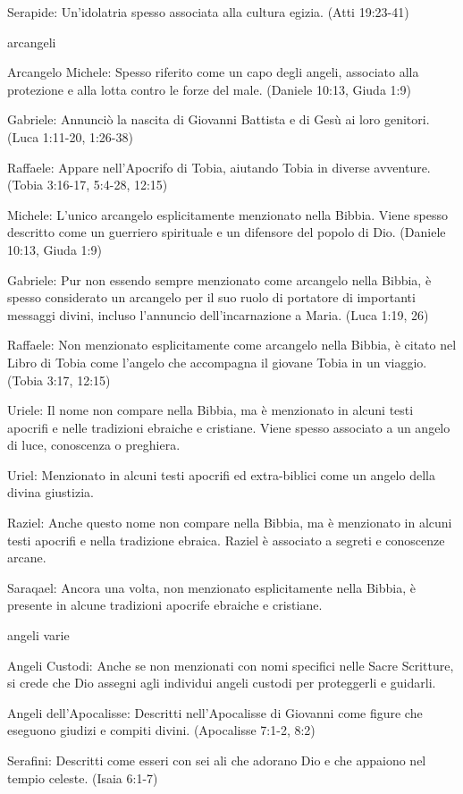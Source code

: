 \documentclass[12pt,a4paper,twoside,openany]{book}
\begin{document}
Serapide: Un'idolatria spesso associata alla cultura egizia. (Atti 19:23-41)


arcangeli


Arcangelo Michele: Spesso riferito come un capo degli angeli, associato alla protezione e alla lotta contro le forze del male. (Daniele 10:13, Giuda 1:9)

Gabriele: Annunciò la nascita di Giovanni Battista e di Gesù ai loro genitori. (Luca 1:11-20, 1:26-38)

Raffaele: Appare nell'Apocrifo di Tobia, aiutando Tobia in diverse avventure. (Tobia 3:16-17, 5:4-28, 12:15)


Michele: L'unico arcangelo esplicitamente menzionato nella Bibbia. Viene spesso descritto come un guerriero spirituale e un difensore del popolo di Dio. (Daniele 10:13, Giuda 1:9)

Gabriele: Pur non essendo sempre menzionato come arcangelo nella Bibbia, è spesso considerato un arcangelo per il suo ruolo di portatore di importanti messaggi divini, incluso l'annuncio dell'incarnazione a Maria. (Luca 1:19, 26)

Raffaele: Non menzionato esplicitamente come arcangelo nella Bibbia, è citato nel Libro di Tobia come l'angelo che accompagna il giovane Tobia in un viaggio. (Tobia 3:17, 12:15)

Uriele: Il nome non compare nella Bibbia, ma è menzionato in alcuni testi apocrifi e nelle tradizioni ebraiche e cristiane. Viene spesso associato a un angelo di luce, conoscenza o preghiera.

Uriel: Menzionato in alcuni testi apocrifi ed extra-biblici come un angelo della divina giustizia.

Raziel: Anche questo nome non compare nella Bibbia, ma è menzionato in alcuni testi apocrifi e nella tradizione ebraica. Raziel è associato a segreti e conoscenze arcane.


Saraqael: Ancora una volta, non menzionato esplicitamente nella Bibbia, è presente in alcune tradizioni apocrife ebraiche e cristiane.

angeli varie

Angeli Custodi: Anche se non menzionati con nomi specifici nelle Sacre Scritture, si crede che Dio assegni agli individui angeli custodi per proteggerli e guidarli.

Angeli dell'Apocalisse: Descritti nell'Apocalisse di Giovanni come figure che eseguono giudizi e compiti divini. (Apocalisse 7:1-2, 8:2)

Serafini: Descritti come esseri con sei ali che adorano Dio e che appaiono nel tempio celeste. (Isaia 6:1-7)
\end{document}
